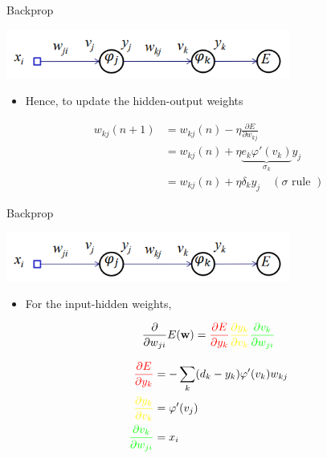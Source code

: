 \documentclass[notes]{beamer}
\providecommand{\tightlist}{%
  \setlength{\itemsep}{0pt}\setlength{\parskip}{0pt}}
\begin{document}
\begin{frame}{Backprop}

\centering 

\includegraphics[width=0.70000\textwidth]{2018-03-10-13-49-42.png}\\

\begin{itemize}
\tightlist
\item
  Hence, to update the hidden-output weights
\end{itemize}

\begin{align}
    w_{kj} (n+1 ) & = w_{kj} (n) - \eta \frac{\partial E}{\partial w_{kj}} \\
    &= w_{kj} (n) + \eta \underbrace{ e_k \varphi ' (v_k)  }_{\sigma_k} y_j  \\ 
    &= w_{kj}(n) + \eta \delta_k y_j \quad (\sigma \textrm{ rule }) 
\end{align}

\end{frame}

\begin{frame}{Backprop}

\centering 

\includegraphics[width=0.70000\textwidth]{2018-03-10-13-49-42.png}\\

\begin{itemize}
\tightlist
\item
  For the input-hidden weights,
\end{itemize}

\begin{equation}
  \frac{\partial }{\partial w_{ji}} E(\vw) = 
    \textcolor{red}{
        \frac{\partial E}{\partial y_k}} 
    \textcolor{yellow}{
        \frac{\partial y_k}{\partial v_k}
    } 
    \textcolor{green}{
        \frac{\partial v_k}{\partial w_{ji}}
    }
\end{equation}

\begin{align}
    \textcolor{red}{
        \frac{\partial E}{\partial y_k}
    } & = - \sum_{k}(d_k - y_k) \varphi ' (v_k) w_{kj} \\
    \textcolor{yellow}{
        \frac{\partial y_k}{\partial v_k}
    } & = \varphi ' (v_j)                               \\
    \textcolor{green}{
        \frac{\partial v_k}{\partial w_{ji}}
    } & = x_i
\end{align}

\end{frame}
\end{document}
